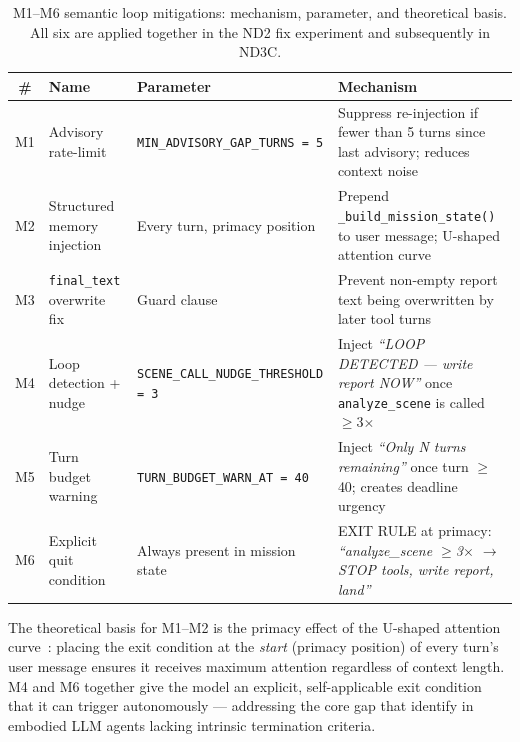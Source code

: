 \begin{table}[ht]
  \caption{M1--M6 semantic loop mitigations: mechanism, parameter, and theoretical basis.
    All six are applied together in the ND2 fix experiment and subsequently in ND3C.}
  \label{tab:ch4_nd2_mitigations}
  \centering
  \small
  \renewcommand{\arraystretch}{1.25}
  \begin{tabular}{cllp{4.2cm}}
    \toprule
    \# & Name & Parameter & Mechanism \\
    \midrule
    M1 & Advisory rate-limit & \texttt{MIN\_ADVISORY\_GAP\_TURNS = 5}
       & Suppress re-injection if fewer than 5 turns since last advisory;
         reduces context noise~\cite{liu2023lostinthemiddle} \\
    M2 & Structured memory injection & Every turn, primacy position
       & Prepend \texttt{\_build\_mission\_state()} to user message;
         U-shaped attention curve~\cite{liu2023lostinthemiddle} \\
    M3 & \texttt{final\_text} overwrite fix & Guard clause
       & Prevent non-empty report text being overwritten by later tool turns \\
    M4 & Loop detection + nudge & \texttt{SCENE\_CALL\_NUDGE\_THRESHOLD = 3}
       & Inject \emph{``LOOP DETECTED --- write report NOW''} once
         \texttt{analyze\_scene} is called $\geq$3$\times$~\cite{runaway2025} \\
    M5 & Turn budget warning & \texttt{TURN\_BUDGET\_WARN\_AT = 40}
       & Inject \emph{``Only N turns remaining''} once turn $\geq$40;
         creates deadline urgency \\
    M6 & Explicit quit condition & Always present in mission state
       & EXIT RULE at primacy: \emph{``analyze\_scene $\geq$3$\times$ $\rightarrow$
         STOP tools, write report, land''}~\cite{yao2022react} \\
    \bottomrule
  \end{tabular}
\end{table}

The theoretical basis for M1--M2 is the primacy effect of the U-shaped attention
curve~\cite{liu2023lostinthemiddle,foundinthemiddle2024}: placing the exit condition at the
\emph{start} (primacy position) of every turn's user message ensures it receives maximum
attention regardless of context length.  M4 and M6 together give the model an explicit,
self-applicable exit condition that it can trigger autonomously --- addressing the core gap
that \citet{runaway2025} identify in embodied LLM agents lacking intrinsic termination
criteria.

